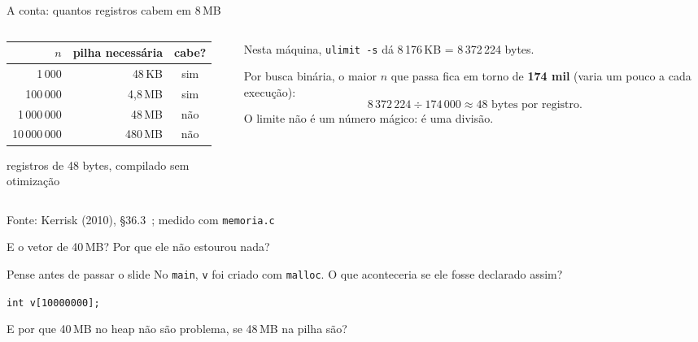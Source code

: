 \documentclass[aspectratio=169]{beamer}
\newcommand{\fonte}[1]{\vfill\hfill{\scriptsize\textcolor{UFSGray}{Fonte: #1}}}
\begin{document}
\begin{frame}{A conta: quantos registros cabem em 8\,MB}
  \begin{columns}[c]
    \begin{column}{0.5\textwidth}
      \begin{center}
        \small
        \begin{tabular}{rrc}
          \toprule
          $n$ & pilha necessária & cabe?\\
          \midrule
          1\,000      & 48\,KB  & sim\\
          100\,000    & 4,8\,MB & sim\\
          1\,000\,000 & 48\,MB  & \textcolor{UFSRed}{não}\\
          10\,000\,000 & 480\,MB & \textcolor{UFSRed}{não}\\
          \bottomrule
        \end{tabular}

        \medskip
        \scriptsize registros de 48 bytes, compilado sem otimização
      \end{center}
    \end{column}
    \begin{column}{0.46\textwidth}
      \small
      Nesta máquina, \texttt{ulimit -s} dá 8\,176\,KB
      = 8\,372\,224 bytes.

      \medskip
      Por busca binária, o maior $n$ que passa fica em torno de \textbf{174 mil} (varia um pouco a cada execução):
      \[
        8\,372\,224 \div 174\,000 \approx 48 \text{ bytes por registro.}
      \]
      O limite não é um número mágico: é uma divisão.
    \end{column}
  \end{columns}
  \fonte{Kerrisk (2010), §36.3~\cite{kerrisk2010linux}; medido com
    \texttt{memoria.c}}
\end{frame}

\begin{frame}{E o vetor de 40\,MB? Por que ele não estourou nada?}
  \begin{block}{Pense antes de passar o slide}
    \small No \texttt{main}, \texttt{v} foi criado com \texttt{malloc}. O que
    aconteceria se ele fosse declarado assim?
    \begin{center}
      \texttt{int v[10000000];}
    \end{center}
    E por que 40\,MB no heap não são problema, se 48\,MB na pilha são?
  \end{block}
\end{frame}
\end{document}
